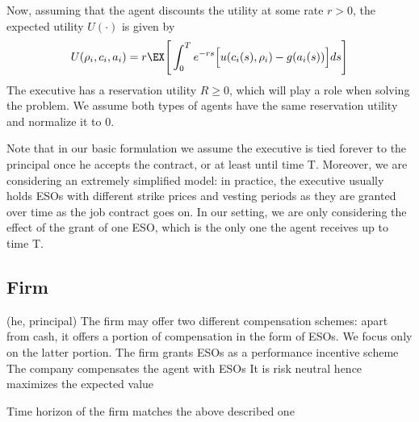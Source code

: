 Now, assuming that the agent discounts the utility at some rate $r>0$, the expected utility $U(\cdot)$ is given by
$$U(\rho_i, c_i, a_i) = r \EX \Bigg[ \int_{0}^{T} e^{-rs} \Big[u(c_i(s), \rho_i) - g(a_i(s)) \Big] ds \Bigg] $$
The executive has a reservation utility $R \ge 0$, which will play a role when solving the problem. We assume both types of agents have the same reservation utility and normalize it to 0. %


Note that in our basic formulation we assume the executive is tied forever to the principal once he accepts the contract, or at least until time T. Moreover, we are considering an extremely simplified model: in practice, the executive usually holds ESOs with different strike prices and vesting periods as they are granted over time as the job contract goes on. In our setting, we are only considering the effect of the grant of one ESO, which is the only one the agent receives up to time T. 






\subsection{Firm}
(he, principal)
The firm may offer two different compensation schemes: apart from cash, it offers a portion of compensation in the form of ESOs. We focus only on the latter portion. The firm grants ESOs as a performance incentive scheme
The company compensates the agent with ESOs
It is risk neutral hence maximizes the expected value


Time horizon of the firm matches the above described one



